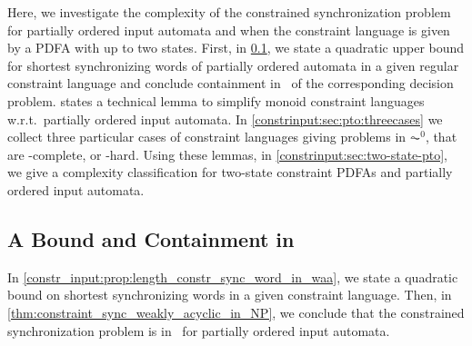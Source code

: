 
Here, we investigate the complexity
of the constrained synchronization problem for partially ordered input automata
and when the constraint language is given by a
PDFA with up to two states.
First, in \cref{constrinput:sec:pto:NP}, 
we state a quadratic upper bound for shortest synchronizing words of partially ordered
automata in a given regular constraint language
and conclude containment in \NP\  of the 
corresponding decision problem.
 states
a technical lemma to simplify monoid constraint languages w.r.t.~partially ordered input automata.
In \cref{constrinput:sec:pto:threecases} we collect
three particular cases of constraint languages giving problems in $\AC^0$, that are \LOGSPACE-complete,
or \NP-hard. Using these lemmas, in \cref{constrinput:sec:two-state-pto},
we give a complexity classification for two-state constraint PDFAs and partially ordered input automata.

\subsection{A Bound and Containment in \texorpdfstring{\NP}{NP}} 
\label{constrinput:sec:pto:NP}

In \cref{constr_input:prop:length_constr_sync_word_in_waa},
we state a quadratic bound on shortest synchronizing
words in a given constraint language.  Then, in \cref{thm:constraint_sync_weakly_acyclic_in_NP}, we conclude 
that the constrained synchronization problem is in \NP\ 
for partially ordered input automata.

